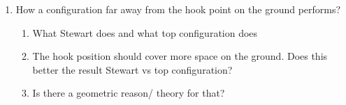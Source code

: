 \begin{enumerate}
    \begin{itemize}
        \item Does the answer change when the desired position is If so, it opens results to the moving hook point. Further away?
        \item Show example on the top configuration and a terrible one.
        \item Are there any papers/theorem that says so?
        \item Show evolution graph
    \end{itemize}  
    \item How a configuration far away from the hook point on the ground performs?
    \begin{enumerate}
        \item What Stewart does and what top configuration does
        \item The hook position should cover more space on the ground. Does this better the result Stewart vs top configuration?
        \item Is there a geometric reason/ theory for that?
    \end{enumerate} 
\end{enumerate}